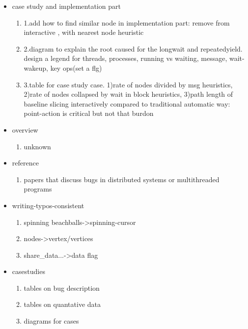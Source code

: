 \begin{itemize}
\item case study and implementation part
	\begin{enumerate}
 	\item 1.add how to find similar node in implementation part: remove from interactive , with nearest node heuristic
 	\item 2.diagram to explain the root caused for the longwait and repeatedyield. design a legend for threads, processes, running vs waiting, message, wait-wakeup, key ops(set a flg)
	\item 3.table for case study case. 
		1)rate of nodes divided by msg heuristics,
		2)rate of nodes collapsed by wait in block heuristics,
		3)path length of baseline slicing interactively compared to traditional automatic way: point-action is critical but not that burdon
	\end{enumerate}
\item overview
	\begin{enumerate}
	\item unknown
	\end{enumerate}
\item reference
	\begin{enumerate}
	\item papers that discuss bugs in distributed systems or multithreaded programs
	\end{enumerate}

\item writing-typos-consistent
	\begin{enumerate}
	\item spinning beachballs->spinning-cursor
	\item nodes->vertex/vertices
	\item share\_data...->data flag
	\end{enumerate}

\item casestudies
	\begin{enumerate}
	\item tables on bug description
	\item tables on quantative data
	\item diagrams for cases
	\end{enumerate}

\end{itemize}
